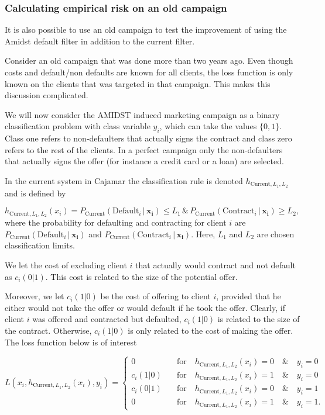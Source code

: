 \documentclass{article}
\theoremstyle{theorem}
\theoremstyle{definition}
\newcommand{\bv}[1]{\bm{#1}}
\begin{document}
{\subsubsection*{Calculating empirical risk on an old campaign}

It is also possible to use an old campaign to test the improvement of using the Amidst default filter in addition to the current filter. 

Consider an old campaign that was done more than two years ago. Even though costs and default/non defaults are known for all clients, the loss function is only known on the clients that was targeted in that campaign.  This makes this discussion complicated. 

We will now consider the AMIDST induced marketing campaign as a binary classification problem with class variable $y_i$, which can take the values $\{0,1\}$. Class one refers to non-defaulters that actually signs the contract and class zero refers to the rest of the clients.  In a perfect campaign only the non-defaulters that actually signs the offer (for instance a credit card or a loan) are selected.  

In the current system in Cajamar the classification rule is denoted $h_{\mbox{Current},L_1,L_2}$ and is defined by

\begin{equation}
\label{def:empRisk}
h_{\mbox{Current},L_1,L_2}(x_i) = P_{\mbox{Current}}(\mbox{Default}_i \,|\, \bv{x_i}) \leq L_1 \, \& \,P_{\mbox{Current}}(\mbox{Contract}_i \,|\, \bv{x_i}) \geq L_2,
\end{equation}
where the probability for defaulting and contracting for client $i$ are $P_{\mbox{Current}}(\mbox{Default}_i \,|\, \bv{x_i})$ and $P_{\mbox{Current}}(\mbox{Contract}_i \,|\, \bv{x_i})$.  Here, $L_1$ and $L_2$ are chosen classification limits. 

We let the cost of excluding client $i$ that actually would contract and not default as $c_i(0|1)$.  This cost is related to the size of the potential offer.

Moreover, we let $c_i(1|0)$ be the cost of offering to client $i$, provided that he either would not take the offer or would default if he took the offer.  Clearly, if client $i$ was offered and contracted but defaulted, $c_i(1|0)$ is related to the size of the contract.  Otherwise, $c_i(1|0)$ is only related to the cost of making the offer.  The loss function below is of interest

\begin{equation}
\label{def:empRiskBank}
L(x_i, h_{\mbox{Current},L_1,L_2}(x_i) , y_i) = 
\begin{cases}
0     &\quad \mbox{for} \quad h_{\mbox{Current},L_1,L_2}(x_i) = 0 \quad \& \quad y_i = 0\\
c_i(1|0)    &\quad \mbox{for} \quad h_{\mbox{Current},L_1,L_2}(x_i) = 1 \quad \& \quad y_i = 0\\
c_i(0|1)      &\quad \mbox{for} \quad h_{\mbox{Current},L_1,L_2}(x_i) = 0 \quad \& \quad y_i = 1\\
0   &\quad \mbox{for} \quad h_{\mbox{Current},L_1,L_2}(x_i) = 1 \quad \& \quad y_i = 1.
\end{cases}
\end{equation}

}
\end{document}
